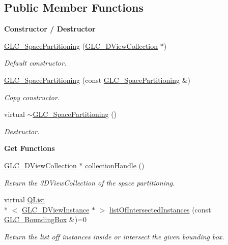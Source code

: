 \subsection*{Public Member Functions}
\begin{Indent}{\bf Constructor / Destructor}\par
\begin{DoxyCompactItemize}
\item 
\hyperlink{class_g_l_c___space_partitioning_a2bbc816f1f2c04e2d6749c4fe314b51c}{G\-L\-C\-\_\-\-Space\-Partitioning} (\hyperlink{class_g_l_c__3_d_view_collection}{G\-L\-C\-\_\-D\-View\-Collection} $\ast$)
\begin{DoxyCompactList}\small\item\em Default constructor. \end{DoxyCompactList}\item 
\hyperlink{class_g_l_c___space_partitioning_a8468247a57a18b4a952984fde34cb4f7}{G\-L\-C\-\_\-\-Space\-Partitioning} (const \hyperlink{class_g_l_c___space_partitioning}{G\-L\-C\-\_\-\-Space\-Partitioning} \&)
\begin{DoxyCompactList}\small\item\em Copy constructor. \end{DoxyCompactList}\item 
virtual \hyperlink{class_g_l_c___space_partitioning_af49a60f818ad6178d9b31b169ec01f68}{$\sim$\-G\-L\-C\-\_\-\-Space\-Partitioning} ()
\begin{DoxyCompactList}\small\item\em Destructor. \end{DoxyCompactList}\end{DoxyCompactItemize}
\end{Indent}
\begin{Indent}{\bf Get Functions}\par
\begin{DoxyCompactItemize}
\item 
\hyperlink{class_g_l_c__3_d_view_collection}{G\-L\-C\-\_\-D\-View\-Collection} $\ast$ \hyperlink{class_g_l_c___space_partitioning_ab9e3f4ade5cfe879fcd94d4740cd265b}{collection\-Handle} ()
\begin{DoxyCompactList}\small\item\em Return the 3\-D\-View\-Collection of the space partitioning. \end{DoxyCompactList}\item 
virtual \hyperlink{class_q_list}{Q\-List}\\*
$<$ \hyperlink{class_g_l_c__3_d_view_instance}{G\-L\-C\-\_\-D\-View\-Instance} $\ast$ $>$ \hyperlink{class_g_l_c___space_partitioning_a0441ee71e06145d4a040f2a7305ea30b}{list\-Of\-Intersected\-Instances} (const \hyperlink{class_g_l_c___bounding_box}{G\-L\-C\-\_\-\-Bounding\-Box} \&)=0
\begin{DoxyCompactList}\small\item\em Return the list off instances inside or intersect the given bounding box. \end{DoxyCompactList}\end{DoxyCompactItemize}
\end{Indent}
